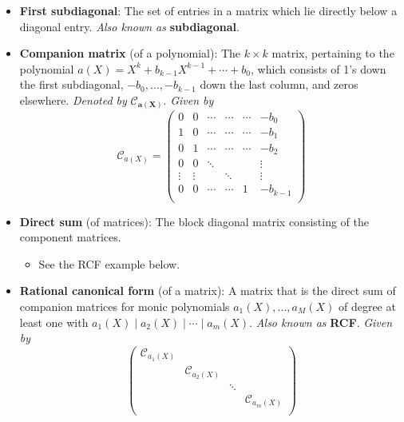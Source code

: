 \documentclass[../notes.tex]{subfiles}
\begin{document}
\begin{itemize}
\begin{itemize}
    \end{itemize}
    \item \textbf{First subdiagonal}: The set of entries in a matrix which lie directly below a diagonal entry. \emph{Also known as} \textbf{subdiagonal}.
    \item \textbf{Companion matrix} (of a polynomial): The $k\times k$ matrix, pertaining to the polynomial $a(X)=X^k+b_{k-1}X^{k-1}+\cdots+b_0$, which consists of 1's down the first subdiagonal, $-b_0,\dots,-b_{k-1}$ down the last column, and zeros elsewhere. \emph{Denoted by} $\bm{\mathcal{C}_{a(X)}}$. \emph{Given by}
    \begin{equation*}
        \mathcal{C}_{a(X)} =
        \begin{pmatrix}
            0      & 0      & \cdots & \cdots & \cdots & -b_0\\
            1      & 0      & \cdots & \cdots & \cdots & -b_1\\
            0      & 1      & \cdots & \cdots & \cdots & -b_2\\
            0      & 0      & \ddots &        &        & \vdots\\
            \vdots & \vdots &        & \ddots &        & \vdots\\
            0      & 0      & \cdots & \cdots & 1      & -b_{k-1}\\
        \end{pmatrix}
    \end{equation*}
    \item \textbf{Direct sum} (of matrices): The block diagonal matrix consisting of the component matrices.
    \begin{itemize}
        \item See the RCF example below.
    \end{itemize}
    \item \textbf{Rational canonical form} (of a matrix): A matrix that is the direct sum of companion matrices for monic polynomials $a_1(X),\dots,a_M(X)$ of degree at least one with $a_1(X)\mid a_2(X)\mid\cdots\mid a_m(X)$. \emph{Also known as} \textbf{RCF}. \emph{Given by}
    \begin{equation*}
        \begin{pmatrix}
            \mathcal{C}_{a_1(X)} &  &  & \\
             & \mathcal{C}_{a_2(X)} &  & \\
             &  & \ddots & \\
             &  &  & \mathcal{C}_{a_m(X)}\\

\end{pmatrix}
\end{equation*}
\end{itemize}
\end{document}
